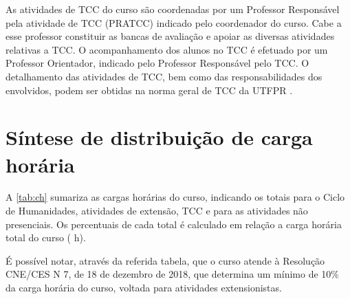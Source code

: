 As atividades de TCC do curso são coordenadas por um Professor Responsável pela atividade de TCC (PRATCC) indicado pelo coordenador do curso. Cabe a esse professor constituir as bancas de avaliação e apoiar as diversas atividades relativas a TCC. O acompanhamento dos alunos no TCC é efetuado por um Professor Orientador, indicado pelo Professor Responsável pelo TCC. O detalhamento das atividades de TCC, bem como das responsabilidades dos envolvidos, podem ser obtidas na norma geral de TCC da UTFPR \cite{cogep18}.

\section{Síntese de distribuição de carga horária}

A \autoref{tab:ch} sumariza as cargas horárias do curso, indicando os totais para o Ciclo de Humanidades, atividades de extensão, TCC e para as atividades não presenciais. Os percentuais de cada total é calculado em relação a carga horária total do curso (\the\value{horasT} h).

É possível notar, através da referida tabela, que o curso atende à Resolução CNE/CES N\textordmasculine{} 7, de 18 de dezembro de 2018, que determina um mínimo de 10$\%$ da carga horária do curso, voltada para atividades extensionistas.

